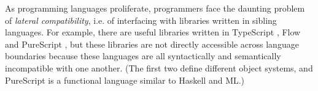 \documentclass[10pt]{sigplanconf}
\begin{document}


%



As programming languages proliferate, programmers face the daunting problem of \emph{lateral compatibility}, i.e. of interfacing with libraries written in sibling languages. For example, there are useful libraries written in TypeScript \cite{bierman2014understanding}, Flow \cite{Flow} and PureScript \cite{PureScript}, but these libraries are not directly accessible across language boundaries because these languages are all syntactically and semantically incompatible with one another. (The first two define different object systems, and PureScript is a functional language similar to Haskell and ML.) 
\end{document}
